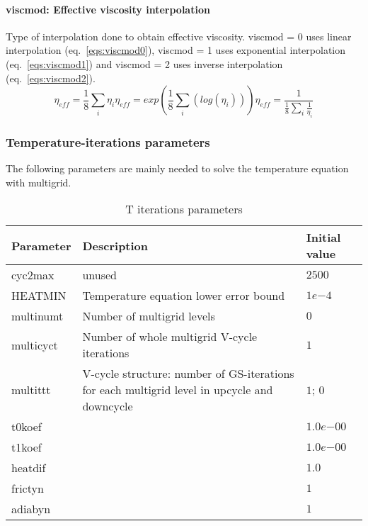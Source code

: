 \paragraph{viscmod: Effective viscosity interpolation}
Type of interpolation done to obtain effective viscosity. viscmod = 0 uses linear interpolation (eq.~\ref{eqs:viscmod0}), viscmod = 1 uses exponential interpolation (eq.~\ref{eqs:viscmod1}) and viscmod = 2 uses inverse interpolation (eq.~\ref{eqs:viscmod2}).
\begin{subequations}
\begin{equation}\label{eqs:viscmod0}
\eta_{eff}=\dfrac{1}{8}\sum_{i}\eta_i
\end{equation}
\begin{equation}\label{eqs:viscmod1}
\eta_{eff}=exp{\left(\dfrac{1}{8}\sum_{i}\left(log\left(\eta_i\right)\right)\right)}
\end{equation}
\begin{equation}\label{eqs:viscmod2}
\eta_{eff}=\dfrac{1}{\frac{1}{8}\sum\limits_{i}{\frac{1}{\eta_i}}}
\end{equation}
\end{subequations}

\subsubsection{Temperature-iterations parameters}
The following parameters are mainly needed to solve the temperature equation with multigrid.

\begin{table}[H]
\small
\centering
\begin{tabular}{l p{9cm} l}
\toprule
Parameter & Description & Initial value \\
\midrule
cyc2max 	& unused & $2500$\\
HEATMIN 	& Temperature equation lower error bound & $1e{-4}$\\
multinumt 	& Number of multigrid levels & $0$\\
multicyct 	& Number of whole multigrid V-cycle iterations & $1$ \\
multittt	& V-cycle structure: number of GS-iterations for each multigrid level in upcycle and downcycle & $1$; $0$ \\
t0koef 		& \todo{???} & $1.0e{-00}$\\
t1koef 		& \todo{???} & $1.0e{-00}$\\
heatdif 	& \todo{???} & $1.0$\\
frictyn 	& \todo{???} & $1$\\
adiabyn 	& \todo{???} & $1$\\
\bottomrule
\end{tabular}
\caption{T iterations parameters}
\label{tbl:mode_t_parameters}
\end{table}

